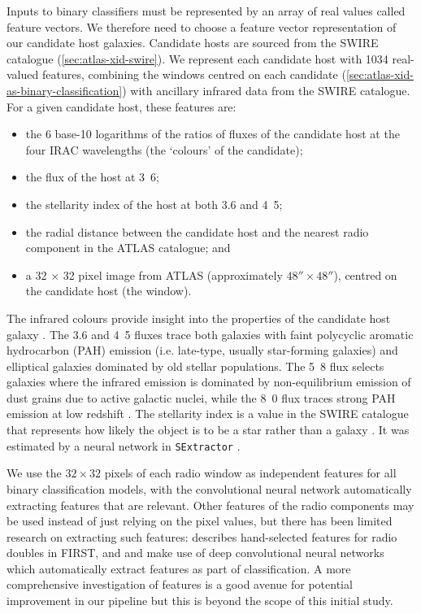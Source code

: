     {Inputs to binary classifiers must be represented by an array of real values called feature vectors.} We therefore need to choose a feature vector representation of our candidate host galaxies. Candidate hosts are sourced from the SWIRE catalogue (\autoref{sec:atlas-xid-swire}). We represent each candidate host with 1034 real-valued features, {combining the windows centred on each candidate (\autoref{sec:atlas-xid-as-binary-classification}) with ancillary infrared data from the SWIRE catalogue}. For a given candidate host, these features are:
    \begin{itemize}
      \item the 6 base-10 logarithms of the ratios of fluxes of the candidate
        host at the four IRAC wavelengths {(the `colours' of the candidate)};
      \item the flux of the host at \unit{3.6}{\micro\meter};
      \item the stellarity index of the host at both 3.6 and
        \unit{4.5}{\micro\meter};
      \item the radial distance between the candidate host and the nearest
        radio component in the ATLAS catalogue; and
      \item a 32 $\times$ 32 pixel image from ATLAS (approximately $48''
        \times 48''$), centred on the candidate host {(the window)}.
    \end{itemize}

    The infrared colours provide insight into the properties {of the candidate
    host galaxy} \citep{grant11polarised}. The 3.6 and \unit{4.5}{\micro\meter} fluxes trace
    both galaxies with faint polycyclic aromatic hydrocarbon (PAH) emission {(i.e. late-type, usually star-forming galaxies)}
    and elliptical galaxies dominated by old stellar populations. The
    \unit{5.8}{\micro\meter} flux selects galaxies where the infrared emission
    is dominated by non-equilibrium emission of dust grains {due to active galactic nuclei},
    while the \unit{8.0}{\micro\meter} flux
    traces strong PAH emission at low redshift \citep{sajina2005}. The
    stellarity index {is a value in the SWIRE catalogue that represents how likely the object is to be a star rather
    than a galaxy \citep{surace05swire}. It was estimated by a neural network in
    \texttt{SExtractor} \citep{bertin96sextractor}}.

    We use the $32 \times 32$ pixels of each radio window as independent
    features for all binary classification models, with the convolutional neural
    network automatically extracting features that are relevant. Other
    features of the radio components may be used instead of just relying on the pixel values,
    but there has been limited research on extracting such features:
    \citet{proctor06} describes hand-selected features for radio doubles in
    FIRST, and \citet{aniyan17cnn} and \citet{lukic18compact} make use of
    deep convolutional neural networks which automatically extract features as
    part of classification. A more comprehensive investigation of features is
    a good avenue for potential improvement in our pipeline but this is beyond
    the scope of this initial study.

